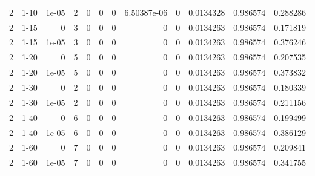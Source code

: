 \begin{tabular}{rlrrrrrrrrrr}
     2 & 1-10   &      1e-05 &           2 &                 0 &                 0 &     0           &     6.50387e-06 &      0           &        0.0134328 &               0.986574 &           0.288286 \\
     2 & 1-15   &      0     &           3 &                 0 &                 0 &     0           &     0           &      0           &        0.0134263 &               0.986574 &           0.171819 \\
     2 & 1-15   &      1e-05 &           3 &                 0 &                 0 &     0           &     0           &      0           &        0.0134263 &               0.986574 &           0.376246 \\
     2 & 1-20   &      0     &           5 &                 0 &                 0 &     0           &     0           &      0           &        0.0134263 &               0.986574 &           0.207535 \\
     2 & 1-20   &      1e-05 &           5 &                 0 &                 0 &     0           &     0           &      0           &        0.0134263 &               0.986574 &           0.373832 \\
     2 & 1-30   &      0     &           2 &                 0 &                 0 &     0           &     0           &      0           &        0.0134263 &               0.986574 &           0.180339 \\
     2 & 1-30   &      1e-05 &           2 &                 0 &                 0 &     0           &     0           &      0           &        0.0134263 &               0.986574 &           0.211156 \\
     2 & 1-40   &      0     &           6 &                 0 &                 0 &     0           &     0           &      0           &        0.0134263 &               0.986574 &           0.199499 \\
     2 & 1-40   &      1e-05 &           6 &                 0 &                 0 &     0           &     0           &      0           &        0.0134263 &               0.986574 &           0.386129 \\
     2 & 1-60   &      0     &           7 &                 0 &                 0 &     0           &     0           &      0           &        0.0134263 &               0.986574 &           0.209841 \\
     2 & 1-60   &      1e-05 &           7 &                 0 &                 0 &     0           &     0           &      0           &        0.0134263 &               0.986574 &           0.341755 \\

\end{tabular}
